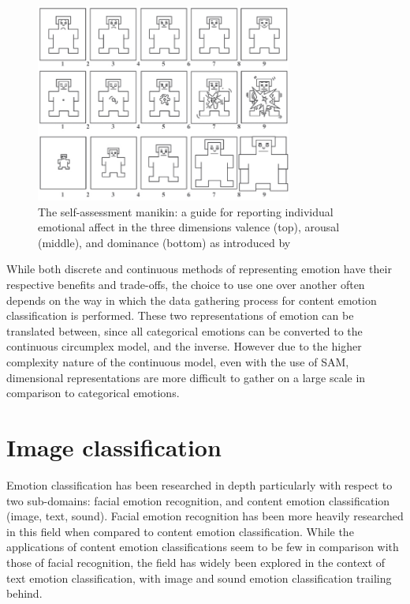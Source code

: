 \documentclass{article}
\begin{document}
\begin{figure}[h!]
	\centering
	\includegraphics[width=0.75\textwidth]{images/self-assessment-manikin.png}
	\caption{The self-assessment manikin: a guide for reporting individual emotional affect in the three dimensions valence (top), arousal (middle), and dominance (bottom) as introduced by \citet{lang1980behavioral}}
	\label{fig:SAM}
\end{figure}

While both discrete and continuous methods of representing emotion have their respective benefits and trade-offs, the choice to use one over another often depends on the way in which the data gathering process for content emotion classification is performed.
These two representations of emotion can be translated between, since all categorical emotions can be converted to the continuous circumplex model, and the inverse.
However due to the higher complexity nature of the continuous model, even with the use of SAM, dimensional representations are more difficult to gather on a large scale in comparison to categorical emotions.


\section{Image classification}

Emotion classification has been researched in depth particularly with respect to two sub-domains: facial emotion recognition, and content emotion classification (image, text, sound).
Facial emotion recognition has been more heavily researched in this field when compared to content emotion classification.
While the applications of content emotion classifications seem to be few in comparison with those of facial recognition, the field has widely been explored in the context of text emotion classification, with image and sound emotion classification trailing behind.
\end{document}

